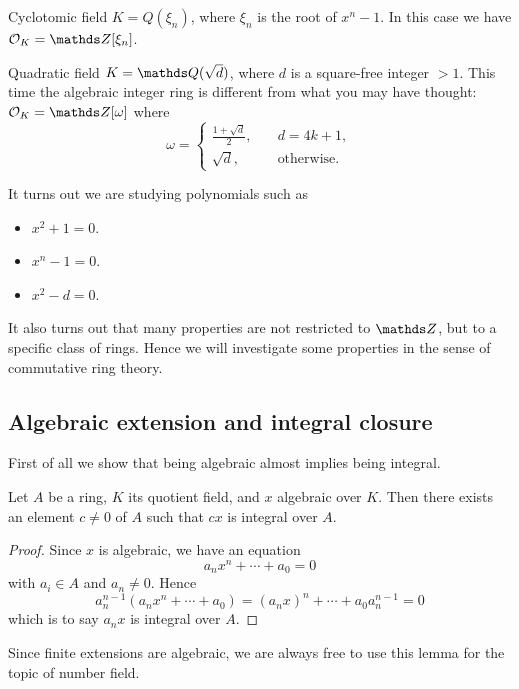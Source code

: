 			\begin{example}
				Cyclotomic field $K=Q(\xi_n)$, where $\xi_n$ is the root of $x^n-1$. In this case we have $\OK = \Z[\xi_n]$.
			\end{example}
			
			\begin{example}
				Quadratic field $K=\Q(\sqrt{d})$, where $d$ is a square-free integer $>1$. This time the algebraic integer ring is different from what you may have thought: $\OK = \Z[\omega]$ where
				\[
				\omega = \begin{cases}
					\frac{1+\sqrt{d}}{2}, &\quad d = 4k+1, \\
					\sqrt{d}, &\quad \text{otherwise}.
				\end{cases}
				\]
			\end{example}
			It turns out we are studying polynomials such as
			\begin{itemize}
				\item $x^2+1=0$.
				\item $x^n-1=0$.
				\item $x^2-d=0$.
			\end{itemize}
		It also turns out that many properties are not restricted to $\Z$, but to a specific class of rings. Hence we will investigate some properties in the sense of commutative ring theory.
		\subsection{Algebraic extension and integral closure}
			First of all we show that being algebraic almost implies being integral. 
			\begin{lemma}\label{alg-int}
				Let $A$ be a ring, $K$ its quotient field, and $x$ algebraic over $K$. Then there exists an element $c \ne 0$ of $A$ such that $cx$ is integral over $A$.
			\end{lemma}
			\begin{proof}
				Since $x$ is algebraic, we have an equation
				\[
					a_nx^n+\cdots+a_0=0
				\]
				with $a_i \in A$ and $a_n \ne 0$. Hence
				\[
					a_n^{n-1}(a_nx^n+\cdots+a_0)=(a_nx)^n+\cdots+a_0a_n^{n-1}=0
				\]
				which is to say $a_nx$ is integral over $A$. 
			\end{proof}
			
			Since finite extensions are algebraic, we are always free to use this lemma for the topic of number field.
			
